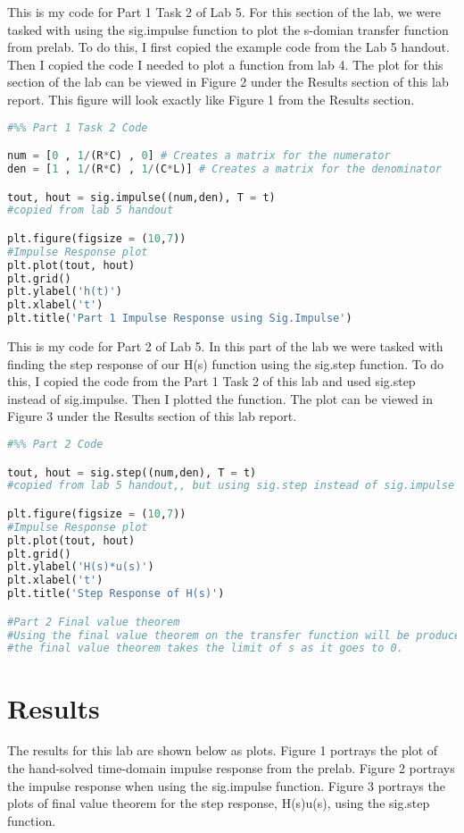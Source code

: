 \documentclass[12pt]{report}
\begin{document}
{This is my code for Part 1 Task 2 of Lab 5. For this section of the lab, we were tasked with using the sig.impulse function to plot the s-domian transfer function from prelab. To do this, I first copied the example code from the Lab 5 handout. Then I copied the code I needed to plot a function from lab 4. The plot for this section of the lab can be viewed in Figure 2 under the Results section of this lab report. This figure will look exactly like Figure 1 from the Results section.  }
\begin{lstlisting}[language=Python]
#%% Part 1 Task 2 Code

num = [0 , 1/(R*C) , 0] # Creates a matrix for the numerator
den = [1 , 1/(R*C) , 1/(C*L)] # Creates a matrix for the denominator

tout, hout = sig.impulse((num,den), T = t)
#copied from lab 5 handout

plt.figure(figsize = (10,7)) 
#Impulse Response plot
plt.plot(tout, hout)
plt.grid()
plt.ylabel('h(t)')
plt.xlabel('t')
plt.title('Part 1 Impulse Response using Sig.Impulse')
\end{lstlisting}



{This is my code for Part 2 of Lab 5. In this part of the lab we were tasked with finding the step response of our H(s) function using the sig.step function. To do this, I copied the code from the Part 1 Task 2 of this lab and used sig.step instead of sig.impulse. Then I plotted the function. The plot can be viewed in Figure 3 under the Results section of this lab report. }
\begin{lstlisting}[language=Python]
#%% Part 2 Code

tout, hout = sig.step((num,den), T = t)
#copied from lab 5 handout,, but using sig.step instead of sig.impulse

plt.figure(figsize = (10,7)) 
#Impulse Response plot
plt.plot(tout, hout)
plt.grid()
plt.ylabel('H(s)*u(s)')
plt.xlabel('t')
plt.title('Step Response of H(s)')

#Part 2 Final value theorem 
#Using the final value theorem on the transfer function will be produce a 0
#the final value theorem takes the limit of s as it goes to 0.
\end{lstlisting}

\section{Results}

The results for this lab are shown below as plots. Figure 1 portrays the plot of the hand-solved time-domain impulse response from the prelab. Figure 2 portrays the impulse response when using the sig.impulse function. Figure 3 portrays the plots of final value theorem for the step response, H(s)u(s), using the sig.step function.    
\end{document}
